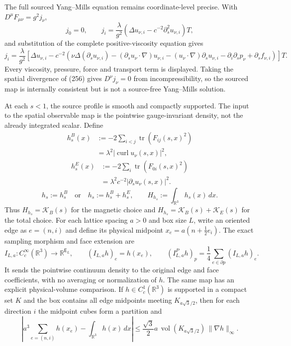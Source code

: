 The full sourced Yang--Mills equation remains coordinate-level precise.  With $D^\mu F_{\mu\nu}=g^2j_\nu$,
\[
 j_0=0,
 \qquad
 j_i=\frac{\lambda}{g^2}
 \left(\Delta u_{\nu,i}-c^{-2}\partial_s^2u_{\nu,i}\right)T,
 \tag{256}
\]
and substitution of the complete positive-viscosity equation gives
\[
 j_i=\frac{\lambda}{g^2}\left[\Delta u_{\nu,i}
 -c^{-2}\left(\nu\Delta(\partial_su_{\nu,i})
 -(\partial_su_\nu\!\cdot\!\nabla)u_{\nu,i}
 -(u_\nu\!\cdot\!\nabla)\partial_su_{\nu,i}
 -\partial_i\partial_sp_\nu+\partial_sf_{\nu,i}\right)\right]T.
 \tag{257}
\]
Every viscosity, pressure, force and transport term is displayed.  Taking the spatial divergence of (256) gives $D^\nu j_\nu=0$ from incompressibility, so the sourced map is internally consistent but is not a source-free Yang--Mills solution.

At each $s<1$, the source profile is smooth and compactly supported.  The input to the spatial observable map is the pointwise gauge-invariant density, not the already integrated scalar.  Define
\[
\begin{aligned}
 h_s^{B}(x)&:=-2\sum_{i<j}\operatorname{tr}(F_{ij}(s,x)^2)\\
            &=\lambda^2|\operatorname{curl}u_\nu(s,x)|^2,
\end{aligned}
\]
\[
\begin{aligned}
 h_s^{E}(x)&:=-2\sum_i\operatorname{tr}(F_{0i}(s,x)^2)\\
            &=\lambda^2c^{-2}|\partial_su_\nu(s,x)|^2.
\end{aligned}
\]
\[
 h_s:=h_s^{B}\quad\text{or}\quad h_s:=h_s^{B}+h_s^{E},\qquad
 H_{h_s}:=\int_{\mathbb R^3}h_s(x)\,dx.
\]
Thus $H_{h_s}=\mathcal K_B(s)$ for the magnetic choice and $H_{h_s}=\mathcal K_B(s)+\mathcal K_E(s)$ for the total choice.  For each lattice spacing $a>0$ and box size $L$, write an oriented edge as $e=(n,i)$ and define its physical midpoint $x_e=a(n+\tfrac12e_i)$.  The exact sampling morphism and face extension are
\[
 I_{L,a}:C_c^\infty(\mathbb R^3)\longrightarrow\mathbb R^{\mathsf E_L},\qquad (I_{L,a}h)_e=h(x_e),\qquad
 (I^P_{L,a}h)_p=\frac14\sum_{e\in\partial p}(I_{L,a}h)_e.
\]
It sends the pointwise continuum density to the original edge and face coefficients, with no averaging or normalization of $h$.  The same map has an explicit physical-volume comparison.  If $h\in C_c^1(\mathbb R^3)$ is supported in a compact set $K$ and the box contains all edge midpoints meeting $K_{a\sqrt3/2}$, then for each direction $i$ the midpoint cubes form a partition and
\[
 \left|a^3\sum_{e=(n,i)}h(x_e)-\int_{\mathbb R^3}h(x)\,dx\right|
 \le \frac{\sqrt3}{2}a\,\operatorname{vol}(K_{a\sqrt3/2})\,\|\nabla h\|_\infty.
\]
